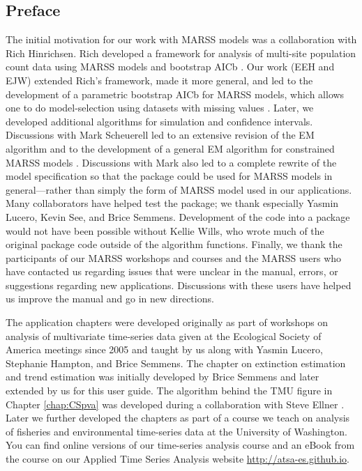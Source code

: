 \subsection*{Preface}

The initial motivation for our work with MARSS models was a collaboration with Rich Hinrichsen. Rich developed a framework for analysis of multi-site population count data using MARSS models and bootstrap AICb \citep{HinrichsenHolmes2009}. Our work (EEH and EJW) extended Rich's framework, made it more general, and led to the development of a parametric bootstrap AICb for MARSS models, which allows one to do model-selection using datasets with missing values \citep{Wardetal2010, HolmesWard2010}.  Later, we developed additional algorithms for simulation and confidence intervals.  Discussions with Mark Scheuerell led to an extensive revision of the EM algorithm and to the development of a general EM algorithm for constrained MARSS models \citep{Holmes2010}.  Discussions with Mark also led to a complete rewrite of the model specification so that the package could be used for MARSS models in general---rather than simply the form of MARSS model used in our applications.  Many collaborators have helped test the package; we thank especially Yasmin Lucero, Kevin See, and Brice Semmens.  Development of the code into a \R package would not have been possible without Kellie Wills, who wrote much of the original package code outside of the algorithm functions.  Finally, we thank the participants of our MARSS workshops and courses and the MARSS users who have contacted us regarding issues that were unclear in the manual, errors, or suggestions regarding new applications.  Discussions with these users have helped us improve the manual and go in new directions.

The application chapters were developed originally as part of workshops on analysis of multivariate time-series data given at the Ecological Society of America meetings since 2005 and taught by us along with Yasmin Lucero, Stephanie Hampton, and Brice Semmens.  The chapter on extinction estimation and trend estimation was initially developed by Brice Semmens and later extended by us for this user guide. The algorithm behind the TMU figure in Chapter \ref{chap:CSpva} was developed during a collaboration with Steve Ellner \citep{EllnerHolmes2008}.  Later we further developed the chapters as part of a course we teach on analysis of fisheries and environmental time-series data at the University of Washington.  You can find online versions of our time-series analysis course and an eBook from the course on our Applied Time Series Analysis website \url{http://atsa-es.github.io}.
 
